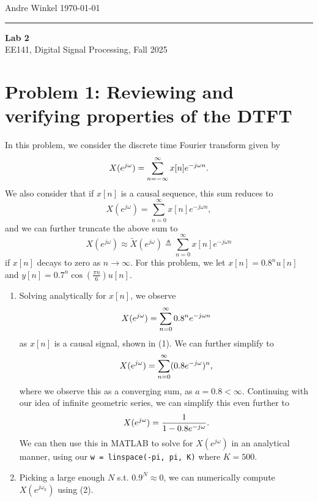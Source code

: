 \documentclass[11pt]{article}
\begin{document}
\noindent Andre Winkel \hfill \today \\
\rule{\textwidth}{0.4pt}

\begin{center} \large {\textbf{Lab 2}} \\[0em] {EE141, Digital Signal Processing, Fall 2025} \end{center}

\section{Problem 1: Reviewing and verifying properties of the DTFT}
In this problem, we consider the discrete time Fourier transform given by
\begin{equation} \notag
    X(e^{j\omega}) = \sum_{n=-\infty}^{\infty}x[n]e^{-j\omega n}.
\end{equation}
We also consider that if $x[n]$ is a causal sequence, this sum reduces to
\begin{equation}
    X(e^{j\omega}) = \sum_{n=0}^{\infty}x[n]e^{-j\omega n},
\end{equation}
and we can further truncate the above sum to
\begin{equation}
    X(e^{j\omega}) \approx \tilde X(e^{j\omega}) \triangleq \sum_{n=0}^{\infty}x[n]e^{-j\omega n}
\end{equation}
if $x[n]$ decays to zero as $n \to \infty$.
For this problem, we let $x[n]=0.8^nu[n]$ and $y[n]=0.7^n\cos(\frac{\pi n}{6})u[n]$.

\begin{enumerate}[label=\textbf{\alph*)}, leftmargin=2.6em]
    \item Solving analytically for $x[n]$, we observe
    \begin{equation} \notag
        X(e^{j\omega}) = \sum_{n=0}^{\infty}0.8^n e^{-j\omega n}
    \end{equation}
    as $x[n]$ is a causal signal, shown in (1). We can further simplify to 
    \begin{equation} \notag
        X(e^{j\omega}) = \sum_{n=0}^{\infty}(0.8e^{-j\omega})^n,
    \end{equation}
    where we observe this as a converging sum, as $a=0.8<\infty$.
    Continuing with our idea of infinite geometric series, we can simplify this even further to
    \begin{equation} \notag
        X(e^{j\omega}) = \frac{1}{1-0.8e^{-j\omega}}.
    \end{equation}
    We can then use this in MATLAB to solve for $X(e^{j\omega})$ in an analytical manner, using our
    \texttt{w = linspace(-pi, pi, K)} where $K = 500$.

    \item Picking a large enough $N$ s.t. $0.9^N\approx 0$, we can numerically compute $X(e^{j\omega_k})$
    using (2).
\end{enumerate}
\end{document}
